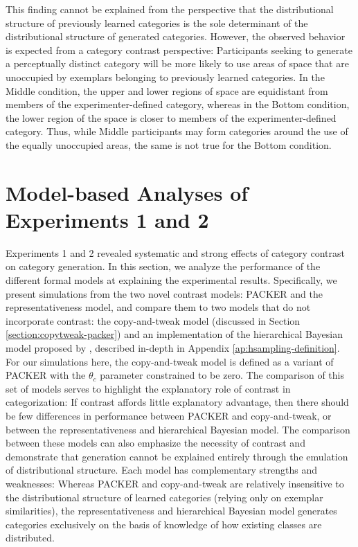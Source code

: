 \documentclass[12pt]{article}
\begin{document}
\begin{flushleft}
This finding cannot be explained from the perspective that the distributional
structure of previously learned categories is the sole determinant of the
distributional structure of generated categories. However, the observed behavior
is expected from a category contrast perspective: Participants seeking to
generate a perceptually distinct category will be more likely to use areas of
space that are unoccupied by exemplars belonging to previously learned
categories. In the Middle condition, the upper and lower regions of space are
equidistant from members of the experimenter-defined category, whereas in the
Bottom condition, the lower region of the space is closer to members of the
experimenter-defined category. Thus, while Middle participants may form
categories around the use of the equally unoccupied areas, the same is not true
for the Bottom condition.

\section{Model-based Analyses of Experiments 1 and 2}

Experiments 1 and 2 revealed systematic and strong effects of category contrast
on category generation. In this section, we analyze the performance of the
different formal models at explaining the experimental results. Specifically, we
present simulations from the two novel contrast models: PACKER and the
representativeness model, and compare them to two models that do not incorporate
contrast: the copy-and-tweak model (discussed in Section
\ref{section:copytweak-packer}) and an implementation of the hierarchical
Bayesian model proposed by \cite{jern2013probabilistic}, described in-depth in
Appendix \ref{ap:hsampling-definition}. For our simulations here, the
copy-and-tweak model is defined as a variant of PACKER with the $\theta_c$
parameter constrained to be zero. The comparison of this set of models serves to
highlight the explanatory role of contrast in categorization: If contrast
affords little explanatory advantage, then there should be few differences in
performance between PACKER and copy-and-tweak, or between the representativeness
and hierarchical Bayesian model. The comparison between these models can also
emphasize the necessity of contrast and demonstrate that generation cannot be
explained entirely through the emulation of distributional structure. Each model
has complementary strengths and weaknesses: Whereas PACKER and copy-and-tweak
are relatively insensitive to the distributional structure of learned categories
(relying only on exemplar similarities), the representativeness and hierarchical
Bayesian model generates categories exclusively on the basis of knowledge of how
existing classes are distributed.


\end{flushleft}
\end{document}
